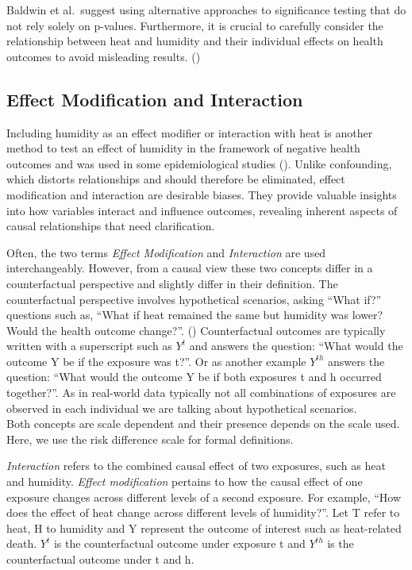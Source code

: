 \documentclass[
]{krantz}
\begin{document}
Baldwin et al.~suggest using alternative approaches to significance testing that do not rely solely on p-values. Furthermore, it is crucial to carefully consider the relationship between heat and humidity and their individual effects on health outcomes to avoid misleading results. (\citet{bald})

\subsection{Effect Modification and Interaction}\label{effect-modification-and-interaction}

Including humidity as an effect modifier or interaction with heat is another method to test an effect of humidity in the framework of negative health outcomes and was used in some epidemiological studies (\citet{bald}). Unlike confounding, which distorts relationships and should therefore be eliminated, effect modification and interaction are desirable biases. They provide valuable insights into how variables interact and influence outcomes, revealing inherent aspects of causal relationships that need clarification.

Often, the two terms \emph{Effect Modification} and \emph{Interaction} are used interchangeably. However, from a causal view these two concepts differ in a counterfactual perspective and slightly differ in their definition. The counterfactual perspective involves hypothetical scenarios, asking ``What if?'' questions such as, ``What if heat remained the same but humidity was lower? Would the health outcome change?''. (\citet{bours}) Counterfactual outcomes are typically written with a superscript such as \(Y^t\) and answers the question: ``What would the outcome Y be if the exposure was t?''. Or as another example \(Y^{th}\) answers the question: ``What would the outcome Y be if both exposures t and h occurred together?''. As in real-world data typically not all combinations of exposures are observed in each individual we are talking about hypothetical scenarios.\\
Both concepts are scale dependent and their presence depends on the scale used. Here, we use the risk difference scale for formal definitions.

\emph{Interaction} refers to the combined causal effect of two exposures, such as heat and humidity. \emph{Effect modification} pertains to how the causal effect of one exposure changes across different levels of a second exposure. For example, ``How does the effect of heat change across different levels of humidity?''.
Let T refer to heat, H to humidity and Y represent the outcome of interest such as heat-related death. \(Y^t\) is the counterfactual outcome under exposure t and \(Y^{th}\) is the counterfactual outcome under t and h.
\end{document}
